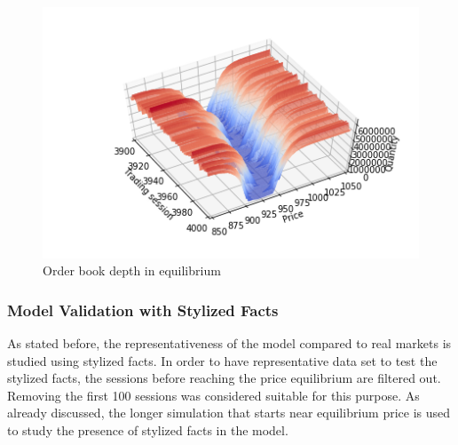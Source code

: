 \begin{figure}
    \includegraphics[width=\linewidth]{plots/basic_market_depth_in_equilibrium.png}
    \caption{Order book depth in equilibrium}
    \label{fig:basic_orderbook_evo}
\end{figure}


\subsubsection{Model Validation with Stylized Facts} %
As stated before, the representativeness of the model compared to real markets 
is studied using stylized facts. In order to have representative data set to 
test the stylized facts, the sessions before reaching the price equilibrium are filtered out.
Removing the first 100 sessions was considered suitable for this purpose. 
As already discussed, the longer simulation that starts near equilibrium 
price is used to study the presence of stylized facts in the model. 

